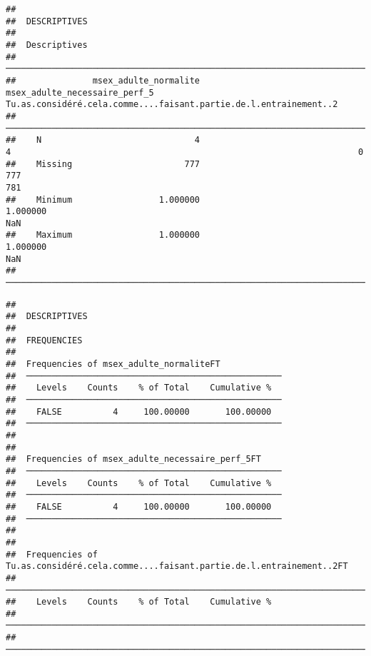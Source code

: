 \documentclass[
]{article}
\begin{document}
\begin{verbatim}
## 
##  DESCRIPTIVES
## 
##  Descriptives                                                                                                                               
##  ────────────────────────────────────────────────────────────────────────────────────────────────────────────────────────────────────────── 
##               msex_adulte_normalite    msex_adulte_necessaire_perf_5    Tu.as.considéré.cela.comme....faisant.partie.de.l.entrainement..2   
##  ────────────────────────────────────────────────────────────────────────────────────────────────────────────────────────────────────────── 
##    N                              4                                4                                                                    0   
##    Missing                      777                              777                                                                  781   
##    Minimum                 1.000000                         1.000000                                                                  NaN   
##    Maximum                 1.000000                         1.000000                                                                  NaN   
##  ──────────────────────────────────────────────────────────────────────────────────────────────────────────────────────────────────────────
\end{verbatim}

\begin{verbatim}
## 
##  DESCRIPTIVES
## 
##  FREQUENCIES
## 
##  Frequencies of msex_adulte_normaliteFT             
##  ────────────────────────────────────────────────── 
##    Levels    Counts    % of Total    Cumulative %   
##  ────────────────────────────────────────────────── 
##    FALSE          4     100.00000       100.00000   
##  ────────────────────────────────────────────────── 
## 
## 
##  Frequencies of msex_adulte_necessaire_perf_5FT     
##  ────────────────────────────────────────────────── 
##    Levels    Counts    % of Total    Cumulative %   
##  ────────────────────────────────────────────────── 
##    FALSE          4     100.00000       100.00000   
##  ────────────────────────────────────────────────── 
## 
## 
##  Frequencies of Tu.as.considéré.cela.comme....faisant.partie.de.l.entrainement..2FT 
##  ────────────────────────────────────────────────────────────────────────────────── 
##    Levels    Counts    % of Total    Cumulative %   
##  ────────────────────────────────────────────────────────────────────────────────── 
##  ──────────────────────────────────────────────────────────────────────────────────
\end{verbatim}
\end{document}

